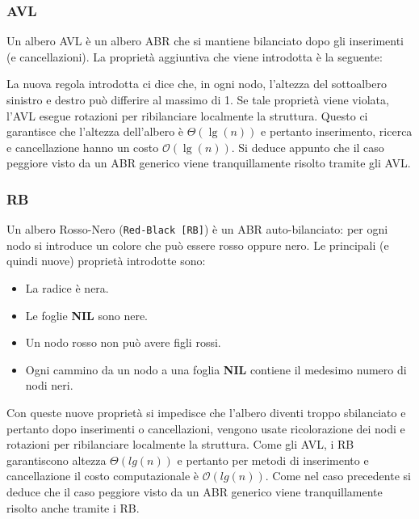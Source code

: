 \subsubsection{AVL}
Un albero AVL è un albero ABR che si mantiene bilanciato dopo gli inserimenti (e cancellazioni). La proprietà aggiuntiva che viene introdotta è la seguente: 
\begin{tcolorbox} [colback=lightgray!20,%
	colframe=black,%
	arc=3mm, auto outer arc,]
\end{tcolorbox}
La nuova regola introdotta ci dice che, in ogni nodo, l'altezza del sottoalbero sinistro e destro può differire al massimo di 1. Se tale proprietà viene violata, l'AVL esegue rotazioni per ribilanciare localmente la struttura. Questo ci garantisce che l'altezza dell'albero è $\Theta(\lg(n))$ e pertanto inserimento, ricerca e cancellazione hanno un costo $\mathcal{O}(\lg(n))$. Si deduce appunto che il caso peggiore visto da un ABR generico viene tranquillamente risolto tramite gli AVL.
\subsubsection{RB}
Un albero Rosso-Nero (\texttt{Red-Black [RB]}) è un ABR auto-bilanciato: per ogni nodo si introduce un colore che può essere rosso oppure nero. Le principali (e quindi nuove) proprietà introdotte sono:
\begin{itemize}
	\item La radice è nera.
	\item Le foglie \textbf{NIL} sono nere.
	\item Un nodo rosso non può avere figli rossi.
	\item Ogni cammino da un nodo a una foglia \textbf{NIL} contiene il medesimo numero di nodi neri.
\end{itemize}
Con queste nuove proprietà si impedisce che l'albero diventi troppo sbilanciato e pertanto dopo inserimenti o cancellazioni, vengono usate ricolorazione dei nodi e rotazioni per ribilanciare localmente la struttura. Come gli AVL, i RB garantiscono altezza $\Theta(lg(n))$ e pertanto per metodi di inserimento e cancellazione il costo computazionale è $\mathcal{O}(lg(n))$. Come nel caso precedente si deduce che il caso peggiore visto da un ABR generico viene tranquillamente risolto anche tramite i RB.
